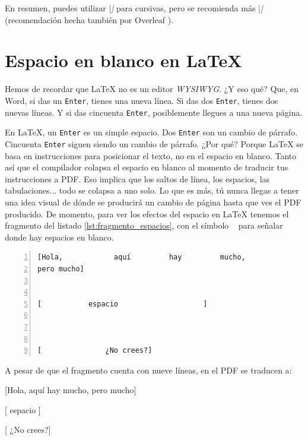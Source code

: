 En resumen, puedes utilizar |\textit| para cursivas, pero se recomienda más |\emph| (recomendación hecha también por Overleaf \cite{bib:overleaf_emph}).



\section{Espacio en blanco en \LaTeX}
\label{sec:espacio_en_blanco_en_latex}



Hemos de recordar que \LaTeX{} no es un editor \emph{WYSIWYG}. ¿Y eso qué? Que, en Word, si das un \texttt{Enter}, tienes una nueva línea. Si das dos \texttt{Enter}, tienes dos nuevas líneas. Y si das cincuenta \texttt{Enter}, posiblemente llegues a una nueva página.

En \LaTeX{}, un \texttt{Enter} es un simple espacio. Dos \texttt{Enter} son un cambio de párrafo. Cincuenta \texttt{Enter} siguen siendo un cambio de párrafo. ¿Por qué? Porque \LaTeX{} se basa en instrucciones para posicionar el texto, no en el espacio en blanco. Tanto así que el compilador colapsa el espacio en blanco al momento de traducir tus instrucciones a PDF. Eso implica que los saltos de línea, los espacios, las tabulaciones... todo se colapsa a uno solo. Lo que es más, tú nunca llegas a tener una idea visual de dónde se producirá un cambio de página hasta que ves el PDF producido. De momento, para ver los efectos del espacio en \LaTeX{} tenemos el fragmento del listado \ref{lst:fragmento_espacios}, con el símbolo \lstinline[showspaces=true,columns=fixed]! ! para señalar donde hay espacios en blanco.

\begin{lstlisting}[style=latex,numbers=left,showspaces=true,label=lst:fragmento_espacios,caption={Fragmento de texto para demostración de espacio en blanco.}]
[Hola,            aquí         hay         mucho,          	
pero mucho]       			
        	
           		
[           espacio                    ]
       	
            	
                    	
[				¿No crees?]   	
\end{lstlisting}

A pesar de que el fragmento cuenta con nueve líneas, en el PDF se traducen a:

\begin{displayquote}{}
[Hola,            aquí         hay         mucho,          	
pero mucho]       			
        	
           		
[           espacio                    ]
       	
            	
                    	
[				¿No crees?]   	
\end{displayquote}

